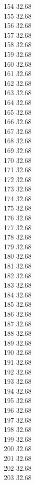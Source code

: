 154	32.68\\
155	32.68\\
156	32.68\\
157	32.68\\
158	32.68\\
159	32.68\\
160	32.68\\
161	32.68\\
162	32.68\\
163	32.68\\
164	32.68\\
165	32.68\\
166	32.68\\
167	32.68\\
168	32.68\\
169	32.68\\
170	32.68\\
171	32.68\\
172	32.68\\
173	32.68\\
174	32.68\\
175	32.68\\
176	32.68\\
177	32.68\\
178	32.68\\
179	32.68\\
180	32.68\\
181	32.68\\
182	32.68\\
183	32.68\\
184	32.68\\
185	32.68\\
186	32.68\\
187	32.68\\
188	32.68\\
189	32.68\\
190	32.68\\
191	32.68\\
192	32.68\\
193	32.68\\
194	32.68\\
195	32.68\\
196	32.68\\
197	32.68\\
198	32.68\\
199	32.68\\
200	32.68\\
201	32.68\\
202	32.68\\
203	32.68\\
